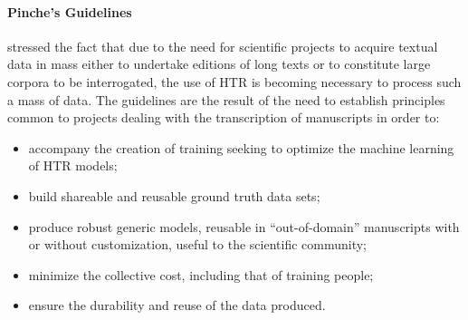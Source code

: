 \documentclass{article}
\begin{document}
\paragraph{Pinche's Guidelines} \label{pincheguidelines}

\cite{pinche:hal-03697382} stressed the fact that due to the need for scientific projects to acquire textual data in mass either to undertake editions of long texts or to constitute large corpora to be interrogated, the use of HTR is becoming necessary to process such a mass of data. The guidelines are the result of the need to establish principles common to projects dealing with the transcription of manuscripts in order to:
\begin{itemize}
    \item accompany the creation of training seeking to optimize the machine learning of HTR models;
    \item build shareable and reusable ground truth data sets;
    \item produce robust generic models, reusable in ``out-of-domain'' manuscripts with or without customization, useful to the scientific community;
    \item minimize the collective cost, including that of training people;
    \item ensure the durability and reuse of the data produced. 
\end{itemize}
\end{document}
